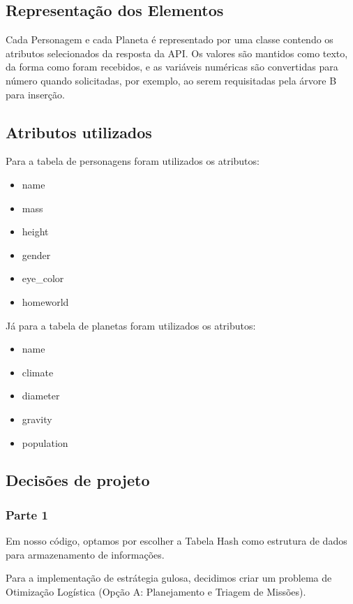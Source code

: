 \documentclass[12pt,a4paper]{article}
\begin{document}
\subsection{Representação dos Elementos}
Cada Personagem e cada Planeta é representado por uma classe contendo os atributos selecionados da resposta da API. Os valores são mantidos como texto, da forma como foram recebidos, e as variáveis numéricas são convertidas para número quando solicitadas, por exemplo, ao serem requisitadas pela árvore B para inserção.

\subsection{Atributos utilizados}
Para a tabela de personagens foram utilizados os atributos:

\begin{itemize}
    \item name
    \item mass
    \item height
    \item gender
    \item eye\_color
    \item homeworld
\end{itemize}

Já para a tabela de planetas foram utilizados os atributos:

\begin{itemize}
    \item name
    \item climate
    \item diameter
    \item gravity
    \item population
\end{itemize}

\subsection{Decisões de projeto}
\subsubsection{Parte 1}
Em nosso código, optamos por escolher a Tabela Hash como estrutura de dados para armazenamento de informações.

Para a implementação de estrátegia gulosa, decidimos criar um problema de Otimização Logística (Opção A: Planejamento e Triagem de Missões).
\end{document}
